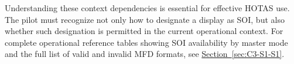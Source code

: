 \documentclass[11pt, a4paper, twoside]{report}
\newcommand{\secref}[1]{\hyperref[#1]{Section~\ref*{#1}}}
\begin{document}
Understanding these context dependencies is essential for effective HOTAS use. The pilot must recognize not only how to designate a display as SOI, but also whether such designation is permitted in the current operational context. For complete operational reference tables showing SOI availability by master mode and the full list of valid and invalid MFD formats, see \secref{sec:C3-S1-S1}.

\end{document}
